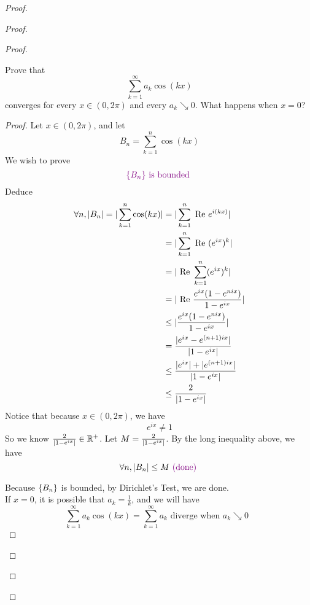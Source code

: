\documentclass{report}
\begin{document}
\begin{proof}
\begin{proof}
\begin{proof}
\begin{question}{}{}
Prove that 
\[
\sum_{k=1}^{\infty} a_k \cos(kx)
\]
converges for every \( x \in (0, 2\pi) \) and every \( a_k \searrow 0 \). What happens when \( x = 0 \)?
\end{question}
\begin{proof}
Let $x\in (0,2\pi)$, and let 
\begin{equation}
B_n=\sum_{k=1}^n \cos(kx)
\end{equation}
We wish to prove
\begin{equation}
\textcolor{violet}{\{ B_n \}\text{ is bounded }}
\end{equation}
Deduce
\begin{align}
  \forall n,|B_n|=|\sum_{k=1}^n \cos (kx)|&= |\sum_{k=1}^n \text{ Re }e^{i(kx)}|\\
  &=|\sum_{k=1}^n \text{ Re }(e^{ix})^k|\\
  &=|\text{ Re }\sum_{k=1}^n (e^{ix})^k|\\
  &=|\text{ Re }\frac{e^{ix}(1-e^{nix})}{1-e^{ix}}|\\
  &\leq |\frac{e^{ix}(1-e^{nix})}{1-e^{ix}}|\\
  &=\frac{|e^{ix}-e^{(n+1)ix}|}{|1-e^{ix}|}\\
  &\leq \frac{|e^{ix}|+|e^{(n+1)ix}|}{|1-e^{ix}|}\\
  &\leq \frac{2}{|1-e^{ix}|}
\end{align}
Notice that because $x\in (0,2\pi)$, we have
\begin{equation}
e^{ix}\neq 1
\end{equation}
So we know $\frac{2}{|1-e^{ix}|}\in\mathbb{R}^+$. Let $M=\frac{2}{|1-e^{ix}|}$. By the long inequality above, we have
\begin{equation}
\forall n, |B_n|\leq M\textcolor{violet}{\text{ (done) }}
\end{equation}

Because $\{ B_n \}$ is bounded, by Dirichlet's Test, we are done.\\

If $x=0$, it is possible that  $a_k=\frac{1}{k}$, and we will have
\begin{equation}
\sum_{k=1}^\infty a_k\cos(kx)=\sum_{k=1}^\infty a_k\text{ diverge when $a_k\searrow 0$ }
\end{equation}
\end{proof}


\end{proof}
\end{proof}
\end{proof}
\end{document}

